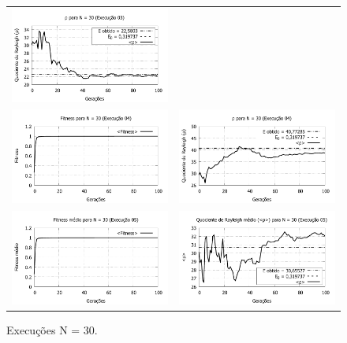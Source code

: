 \begin{figure}[htbp]
\begin{tabular}{@{}cc@{}}
    \includegraphics[width=.45\textwidth]{figs/resultados/fitnessGrad/N30_03_rho.pdf}   \\
		\includegraphics[width=.45\textwidth]{figs/resultados/fitnessGrad/N30_04_fitness.pdf} &
    \includegraphics[width=.45\textwidth]{figs/resultados/fitnessGrad/N30_04_rho.pdf}   \\
		\includegraphics[width=.45\textwidth]{figs/resultados/fitnessGrad/N30_05_fitness.pdf} &
    \includegraphics[width=.45\textwidth]{figs/resultados/fitnessGrad/N30_05_rho.pdf}
  \end{tabular}
  \caption{Execuções N = 30.}
	\label{fig:execucoes_N30}
\end{figure}

